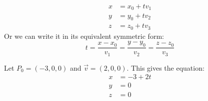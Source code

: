 \begin{itemize}
\begin{align}
        x &= x_0 + tv_1 \\ 
        y &= y_0 + tv_2 \\ 
        z &= z_0 + tv_3
    \end{align}
    Or we can write it in its equivalent symmetric form:
    \begin{equation}
        t = \frac{x-x_0}{v_1} = \frac{y-y_0}{v_2} = \frac{z-z_0}{v_3}
    \end{equation}
    \begin{example}
        Let $P_0=(-3,0,0)$ and $\vec{v}=(2,0,0)$. This gives the equation:
        \begin{align}
            x &= -3 + 2t \\ 
            y &= 0 \\ 
            z &= 0
        \end{align}
    \end{example}
\end{itemize}